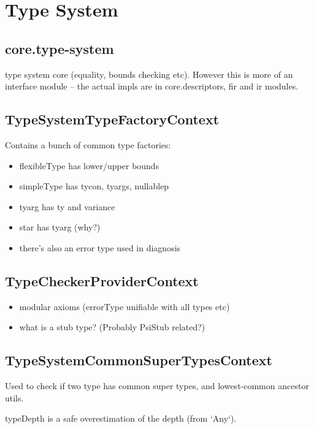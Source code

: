 \documentclass{article}
\begin{document}
\section{Type System}

\subsection{core.type-system}

type system core (equality, bounds checking etc). However this is more of an interface module -- the actual impls are in core.descriptors, fir and ir modules.

\subsection{TypeSystemTypeFactoryContext}

Contains a bunch of common type factories:

\begin{itemize}
    \item flexibleType has lower/upper bounds
    \item simpleType has tycon, tyargs, nullablep
    \item tyarg has ty and variance
    \item star has tyarg (why?)
    \item there's also an error type used in diagnosis
\end{itemize}

\subsection{TypeCheckerProviderContext}

\begin{itemize}
    \item modular axioms (errorType unifiable with all types etc)
    \item what is a stub type? (Probably PsiStub related?)
\end{itemize}

\subsection{TypeSystemCommonSuperTypesContext}

Used to check if two type has common super types, and lowest-common ancestor utils.

typeDepth is a safe overestimation of the depth (from `Any`).
\end{document}
